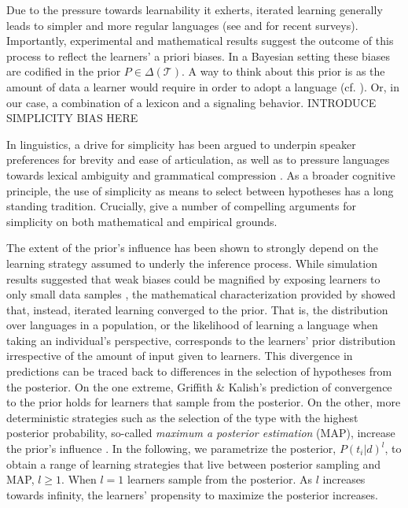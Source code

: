 \documentclass[a4paper]{article}
\newcommand{\hl}[1]{\textcolor[rgb]{.8,.33,.0}{#1}}%
\begin{document}
Due to the pressure towards learnability it exherts, iterated learning generally leads to simpler and more regular languages (see \citealt{kirby+etal:2014} and \citealt{tamariz+kirby:2016} for recent surveys). Importantly, experimental and mathematical results suggest the outcome of this process to reflect the learners' a priori biases. In a Bayesian setting these biases are codified in the prior $P \in \Delta(\mathcal{T})$. A way to think about this prior is as the amount of data a learner would require in order to adopt a language (cf. \citealt[450]{griffiths+kalish:2007}). Or, in our case, a combination of a lexicon and a signaling behavior. \hl{INTRODUCE SIMPLICITY BIAS HERE}

\hl{ In linguistics, a drive for simplicity has been argued to underpin speaker preferences for brevity and ease of articulation, as well as to pressure languages towards lexical ambiguity and grammatical compression \citep{zipf:1949,grice:1975,piantadosi+etal:2012, kirby+etal:2015}. As a broader cognitive principle, the use of simplicity as means to select between hypotheses has a long standing tradition. Crucially, \citet{chater+vitanyi:2003} give a number of compelling arguments for simplicity on both mathematical and empirical grounds.}


The extent of the prior's influence has been shown to strongly depend on the learning strategy assumed to underly the inference process. While simulation results suggested that weak biases could be magnified by exposing learners to only small data samples \citep{brighton:2002}, the mathematical characterization provided by \citet{griffiths+kalish:2007} showed that, instead, iterated learning converged to the prior. That is, the distribution over languages in a population, or the likelihood of learning a language when taking an individual's perspective, corresponds to the learners' prior distribution irrespective of the amount of input given to learners. This divergence in predictions can be traced back to differences in the selection of hypotheses from the posterior. On the one extreme, Griffith \& Kalish's prediction of convergence to the prior holds for learners that sample from the posterior. On the other, more deterministic strategies such as the selection of the type with the highest posterior probability, so-called {\it maximum a posterior estimation} (MAP), increase the prior's influence \citep{griffiths+kalish:2007,kirby+etal:2007}. In the following, we parametrize the posterior, $P(t_i|d)^l$, to obtain a range of learning strategies that live between posterior sampling and MAP, $l \geq 1$. When $l = 1$ learners sample from the posterior. As $l$ increases towards infinity, the learners' propensity to maximize the posterior increases. 
\end{document}
